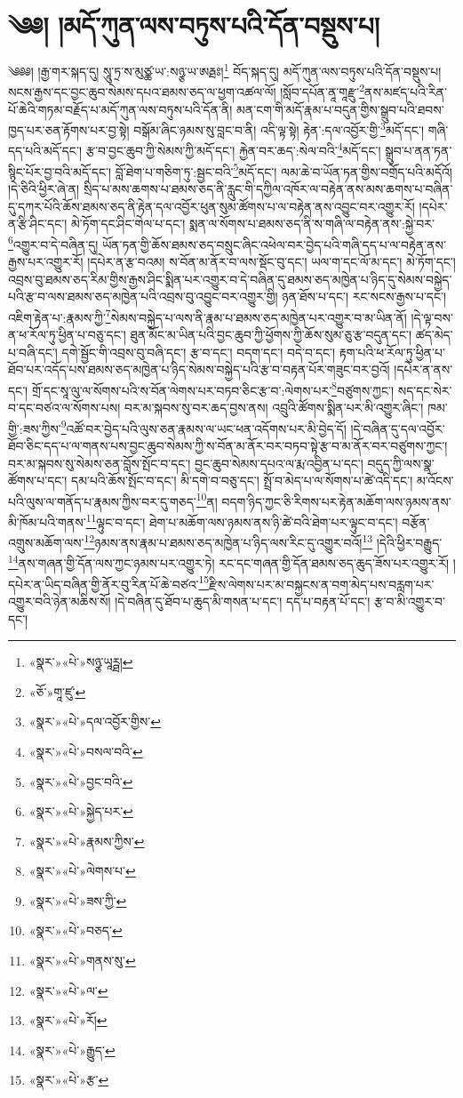 \chapter{༄༅། །མདོ་ཀུན་ལས་བཏུས་པའི་དོན་བསྡུས་པ།}༄༅༅། །རྒྱ་གར་སྐད་དུ། སཱུ་ཏྲ་ས་མུཙྪ་ཡ་:སཉྩ་ཡ་ཨརྠཿ།\footnote{«སྣར་»«པེ་»སཉྩ་ཡཱཪྠ།} བོད་སྐད་དུ། མདོ་ཀུན་ལས་བཏུས་པའི་དོན་བསྡུས་པ། སངས་རྒྱས་དང་བྱང་ཆུབ་སེམས་དཔའ་ཐམས་ཅད་ལ་ཕྱག་འཚལ་ལོ། །སློབ་དཔོན་ནཱ་གཱརྫུ་\footnote{«ཅོ་»གཱ་ཛུ་}ནས་མཛད་པའི་རིན་པོ་ཆེའི་གཏམ་བརྗོད་པ་མདོ་ཀུན་ལས་བཏུས་པའི་དོན་ནི། མན་ངག་གི་མདོ་རྣམ་པ་བདུན་གྱིས་སྒྲུབ་པའི་ཐབས་ཁྱད་པར་ཅན་རྟོགས་པར་བྱ་སྟེ། བསྒོམ་ཞིང་ཉམས་སུ་བླང་བ་ནི། འདི་ལྟ་སྟེ། རྟེན་:དལ་འབྱོར་གྱི་\footnote{«སྣར་»«པེ་»དལ་འབྱོར་གྱིས་}མདོ་དང་། གཞི་དད་པའི་མདོ་དང་། རྩ་བ་བྱང་ཆུབ་ཀྱི་སེམས་ཀྱི་མདོ་དང་། རྐྱེན་བར་ཆད་:སེལ་བའི་\footnote{«སྣར་»«པེ་»བསལ་བའི་}མདོ་དང་། སྒྲུབ་པ་ནན་ཏན་སྙིང་པོར་བྱ་བའི་མདོ་དང་། བློ་ཐེག་པ་གཅིག་ཏུ་:སྦྱང་བའི་\footnote{«སྣར་»«པེ་»བྱང་བའི་}མདོ་དང་། ལམ་ཆེ་བ་ཡོན་ཏན་གྱིས་བགྲོད་པའི་མདོའོ། །དེ་ཅིའི་ཕྱིར་ཞེ་ན། སྲིད་པ་མས་ཆགས་པ་ཐམས་ཅད་ནི་རླུང་གི་དཀྱིལ་འཁོར་ལ་བརྟེན་ནས་མས་ཆགས་པ་བཞིན་དུ་དཀར་པོའི་ཆོས་ཐམས་ཅད་ནི་རྟེན་དལ་འབྱོར་ཕུན་སུམ་ཚོགས་པ་ལ་བརྟེན་ནས་འབྱུང་བར་འགྱུར་རོ། །དཔེར་ན་རྩི་ཤིང་དང་། མེ་ཏོག་དང་ཤིང་གེལ་པ་དང་། སྨན་ལ་སོགས་པ་ཐམས་ཅད་ནི་ས་གཞི་ལ་བརྟེན་ནས་:སྐྱེ་བར་\footnote{«སྣར་»«པེ་»སྐྱེད་པར་}འགྱུར་བ་དེ་བཞིན་དུ། ཡོན་ཏན་གྱི་ཆོས་ཐམས་ཅད་བསྲུང་ཞིང་འཕེལ་བར་བྱེད་པའི་གཞི་དད་པ་ལ་བརྟེན་ནས་རྒྱས་པར་འགྱུར་རོ། །དཔེར་ན་རྩ་བའམ། ས་བོན་མ་ནོར་བ་ལས་སྡོང་བུ་དང་། ཡལ་ག་དང་ལོ་མ་དང་། མེ་ཏོག་དང་། འབྲས་བུ་ཐམས་ཅད་རིམ་གྱིས་རྒྱས་ཤིང་སྨིན་པར་འགྱུར་བ་དེ་བཞིན་དུ་ཐམས་ཅད་མཁྱེན་པ་ཉིད་དུ་སེམས་བསྐྱེད་པའི་རྩ་བ་ལས་ཐམས་ཅད་མཁྱེན་པའི་འབྲས་བུ་འབྱུང་བར་འགྱུར་གྱི། ཉན་ཐོས་པ་དང་། རང་སངས་རྒྱས་པ་དང་། འཇིག་རྟེན་པ་:རྣམས་ཀྱི་\footnote{«སྣར་»«པེ་»རྣམས་ཀྱིས་}སེམས་བསྐྱེད་པ་ལས་ནི་རྣམ་པ་ཐམས་ཅད་མཁྱེན་པར་འགྱུར་བ་མ་ཡིན་ནོ། །དེ་ལྟ་བས་ན་ཕ་རོལ་ཏུ་ཕྱིན་པ་བཅུ་དང་། ཐུན་མོང་མ་ཡིན་པའི་བྱང་ཆུབ་ཀྱི་ཕྱོགས་ཀྱི་ཆོས་སུམ་ཅུ་རྩ་བདུན་དང་། ཚད་མེད་པ་བཞི་དང་། དགེ་སྦྱོང་གི་འབྲས་བུ་བཞི་དང་། རྩ་བ་དང་། བདག་དང་། བདེ་བ་དང་། རྟག་པའི་ཕ་རོལ་ཏུ་ཕྱིན་པ་ཐོབ་པར་འདོད་པས་ཐམས་ཅད་མཁྱེན་པ་ཉིད་སེམས་བསྐྱེད་པའི་རྩ་བ་བརྟན་པོར་གཟུང་བར་བྱའོ། །དཔེར་ན་ནས་དང་། གྲོ་དང་སཱ་ལུ་ལ་སོགས་པའི་ས་བོན་ལེགས་པར་བཏབ་ཅིང་རྩ་བ་:ལེགས་པར་\footnote{«སྣར་»«པེ་»ལེགས་པ་}བཙུགས་ཀྱང་། སད་དང་སེར་བ་དང་བཙའ་ལ་སོགས་པས། བར་མ་སྐབས་སུ་བར་ཆད་བྱས་ནས། འབྲུའི་ཚོགས་སྨིན་པར་མི་འགྱུར་ཞིང་། ཁམ་གྱི་:ཟས་ཀྱིས་\footnote{«སྣར་»«པེ་»ཟས་ཀྱི་}འཚོ་བར་བྱེད་པའི་ལུས་ཅན་རྣམས་ལ་ཡང་ཕན་འདོགས་པར་མི་བྱེད་དོ། །དེ་བཞིན་དུ་དལ་འབྱོར་ཐོབ་ཅིང་དད་པ་ལ་གནས་པས་བྱང་ཆུབ་སེམས་ཀྱི་ས་བོན་མ་ནོར་བར་བཏབ་སྟེ་རྩ་བ་མ་ནོར་བར་བཙུགས་ཀྱང་། བར་མ་སྐབས་སུ་སེམས་ཅན་བློས་སྤོང་བ་དང་། བྱང་ཆུབ་སེམས་དཔའ་ལ་རྨ་འབྱིན་པ་དང་། བདུད་ཀྱི་ལས་སྣ་ཚོགས་པ་དང་། དམ་པའི་ཆོས་སྤོང་བ་དང་། མི་དགེ་བ་བཅུ་དང་། སྤྲོ་བ་མེད་པ་ལ་སོགས་པ་ཚེ་འདི་དང་། མ་འོངས་པའི་ལུས་ལ་གནོད་པ་རྣམས་ཀྱིས་བར་དུ་གཅད་\footnote{«སྣར་»«པེ་»བཅད་}ན། བདག་ཉིད་ཀྱང་ཅི་རིགས་པར་རྟེན་མཆོག་ལས་ཉམས་ནས་མི་ཁོམ་པའི་གནས་\footnote{«སྣར་»«པེ་»གནས་སུ་}ལྟུང་བ་དང་། ཐེག་པ་མཆོག་ལས་ཉམས་ནས་ཉི་ཚེ་བའི་ཐེག་པར་ལྟུང་བ་དང་། བརྩོན་འགྲུས་མཆོག་ལས་\footnote{«སྣར་»«པེ་»ལ་}ཉམས་ནས་རྣམ་པ་ཐམས་ཅད་མཁྱེན་པ་ཉིད་ལས་རིང་དུ་འགྱུར་བའོ།\footnote{«སྣར་»«པེ་»རོ།} །དེའི་ཕྱིར་བརྒྱུད་\footnote{«སྣར་»«པེ་»རྒྱུད་}ནས་གཞན་གྱི་དོན་ལས་ཀྱང་ཉམས་པར་འགྱུར་ཏེ། རང་དང་གཞན་གྱི་དོན་ཐམས་ཅད་ཆུད་ཟོས་པར་འགྱུར་རོ། །དཔེར་ན་ཡིད་བཞིན་གྱི་ནོར་བུ་རིན་པོ་ཆེ་བཙའ་\footnote{«སྣར་»«པེ་»རྩ་}རྫིས་ལེགས་པར་མ་བསྐྱངས་ན་བག་མེད་པས་བརླག་པར་འགྱུར་བའི་ཉེན་མཆིས་སོ། །དེ་བཞིན་དུ་ཐོབ་པ་ཆུད་མི་གསན་པ་དང་། དད་པ་བརྟན་པོ་དང་། རྩ་བ་མི་འགྱུར་བ་དང་། 